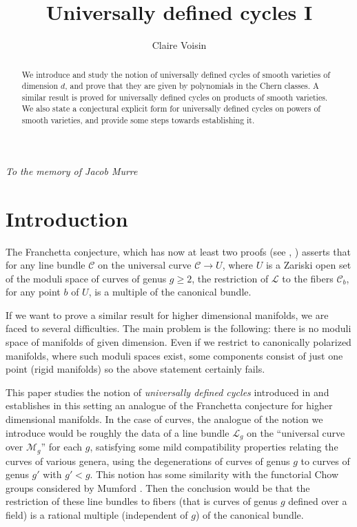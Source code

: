 \documentclass[10pt]{article}
\title{Universally defined cycles I}
\author{Claire Voisin}
\date{}
\begin{document}
\maketitle

\begin{center} {\it To the memory of Jacob Murre}
\end{center}
\begin{abstract} We introduce and study the notion of universally defined cycles of smooth varieties of dimension $d$, and prove that they are given by polynomials in the Chern classes. A similar result is proved for universally defined cycles on products of smooth varieties. We also state a conjectural explicit form for universally defined cycles on powers of smooth varieties, and provide some steps towards establishing it.
 \end{abstract}
\section{Introduction}
The  Franchetta conjecture, which has now at least two  proofs (see \cite{mestrano}, \cite{harer})
asserts that for  any line bundle $\mathcal{C}$ on the universal curve
$\mathcal{C}\rightarrow U$,  where $U$ is a Zariski open set of the moduli space
of curves of genus $g\geq2$, the restriction  of $\mathcal{L}$ to the fibers
$\mathcal{C}_b$, for any point $b$ of $U$, is a multiple of the canonical bundle.

If we want to prove a similar result for higher dimensional manifolds, we are faced to several difficulties.
The main problem is the following: there is no moduli space of manifolds of given dimension. Even if we restrict
to canonically polarized manifolds, where such moduli spaces exist, some components
consist of just one point (rigid manifolds) so the above statement
certainly fails.

This paper studies the notion of  {\it universally defined cycles} introduced in \cite{voisindiagonal} and establishes
in this setting   an analogue of the Franchetta conjecture for higher dimensional manifolds. In the case of curves, the
analogue of the notion we introduce
would be roughly  the data  of a line bundle $\mathcal{L}_g$  on the ``universal curve over
$\mathcal{M}_g$'' for each $g$, satisfying
some mild compatibility properties relating the curves of various genera, using the degenerations
of curves of genus $g$ to curves of  genus $g'$ with $g'< g$. This notion has some similarity with the functorial Chow groups considered by Mumford \cite{mumford}.  Then the conclusion would be that
the restriction of these line bundles to fibers (that is curves of genus
 $g$ defined over a field) is  a rational multiple (independent of $g$) of the canonical bundle.
\end{document}
